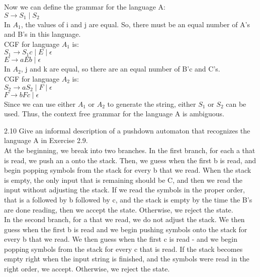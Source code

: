 \documentclass[12pt]{article}
\begin{document}
Now we can define the grammar for the language A: \\
$S \rightarrow S_1 \; | \; S_2$ \\

In $A_1$, the values of i and j are equal. So, there must be an equal number
of A's and B's in this language. \\

CGF for language $A_1$ is: \\
$S_1 \rightarrow S_1 c \; | \; E \; | \; \epsilon $ \\
$E \rightarrow aEb \; | \; \epsilon  $ \\

In $A_2$, j and k are equal, so there are an equal number of B'c and C's. \\

CGF for language $A_2$ is: \\
$S_2 \rightarrow a S_2 \; | \; F \; | \; \epsilon $ \\
$F \rightarrow bFc \; | \; \epsilon  $ \\

Since we can use either $A_1$ or $A_2$ to generate the string, either $S_1$ or
$S_2$ can be used. Thus, the context free grammar for the language A is ambiguous. \\

\pagebreak

2.10 Give an informal description of a pushdown automaton that recognizes the language A in Exercise 2.9. \\

At the beginning, we break into two branches. In the first branch, for each a that is read,
we push an a onto the stack. Then, we guess when the first b is read, and begin popping
symbols from the stack for every b that we read. When the stack is empty, the only input
that is remaining should be C, and then we read the input without adjusting the stack.
If we read the symbols in the proper order, that is a followed by b followed by c,
and the stack is empty by the time the B's are done reading, then we accept the state.
Otherwise, we reject the state. \\

In the second branch, for a that we read, we do not adjust the stack. We then guess
when the first b is read and we begin pushing symbols onto the stack for every b that
we read. We then guess when the first c is read - and we begin popping symbols from the
stack for every c that is read. If the stack becomes empty right when the input string
is finished, and the symbols were read in the right order, we accept. Otherwise, we
reject the state. \\
\end{document}
